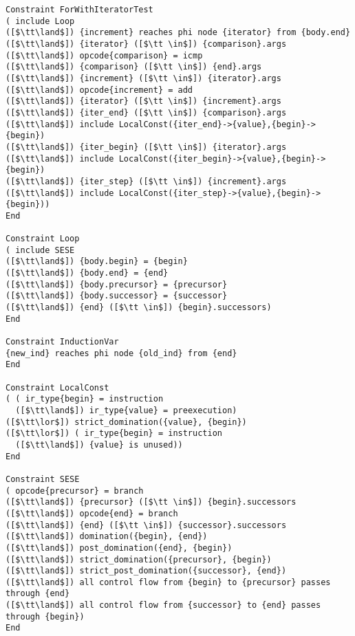 \begin{lstlisting}[language=CAnDL]
Constraint ForWithIteratorTest
( include Loop
([$\tt\land$]) {increment} reaches phi node {iterator} from {body.end}
([$\tt\land$]) {iterator} ([$\tt \in$]) {comparison}.args
([$\tt\land$]) opcode{comparison} = icmp
([$\tt\land$]) {comparison} ([$\tt \in$]) {end}.args
([$\tt\land$]) {increment} ([$\tt \in$]) {iterator}.args
([$\tt\land$]) opcode{increment} = add
([$\tt\land$]) {iterator} ([$\tt \in$]) {increment}.args
([$\tt\land$]) {iter_end} ([$\tt \in$]) {comparison}.args
([$\tt\land$]) include LocalConst({iter_end}->{value},{begin}->{begin})
([$\tt\land$]) {iter_begin} ([$\tt \in$]) {iterator}.args
([$\tt\land$]) include LocalConst({iter_begin}->{value},{begin}->{begin})
([$\tt\land$]) {iter_step} ([$\tt \in$]) {increment}.args
([$\tt\land$]) include LocalConst({iter_step}->{value},{begin}->{begin}))
End

Constraint Loop
( include SESE
([$\tt\land$]) {body.begin} = {begin}
([$\tt\land$]) {body.end} = {end}
([$\tt\land$]) {body.precursor} = {precursor}
([$\tt\land$]) {body.successor} = {successor}
([$\tt\land$]) {end} ([$\tt \in$]) {begin}.successors)
End

Constraint InductionVar
{new_ind} reaches phi node {old_ind} from {end}
End

Constraint LocalConst
( ( ir_type{begin} = instruction
  ([$\tt\land$]) ir_type{value} = preexecution)
([$\tt\lor$]) strict_domination({value}, {begin})
([$\tt\lor$]) ( ir_type{begin} = instruction
  ([$\tt\land$]) {value} is unused))
End

Constraint SESE
( opcode{precursor} = branch
([$\tt\land$]) {precursor} ([$\tt \in$]) {begin}.successors
([$\tt\land$]) opcode{end} = branch
([$\tt\land$]) {end} ([$\tt \in$]) {successor}.successors
([$\tt\land$]) domination({begin}, {end})
([$\tt\land$]) post_domination({end}, {begin})
([$\tt\land$]) strict_domination({precursor}, {begin})
([$\tt\land$]) strict_post_domination({successor}, {end})
([$\tt\land$]) all control flow from {begin} to {precursor} passes through {end}
([$\tt\land$]) all control flow from {successor} to {end} passes through {begin})
End
\end{lstlisting}
